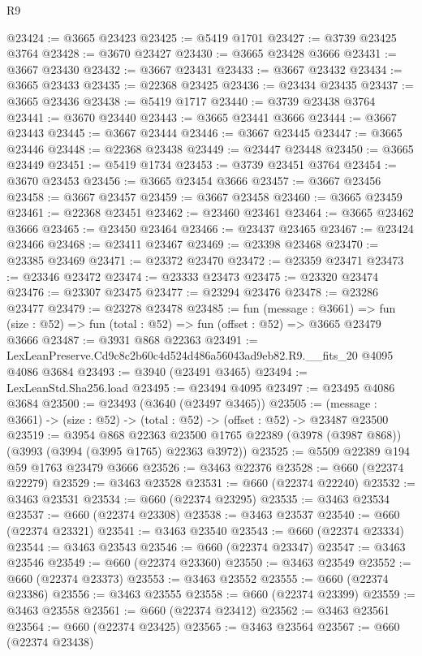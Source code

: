 \begin{lexlean}{R9}
\begin{coremodule}
@23424 := @3665 @23423
@23425 := @5419 @1701
@23427 := @3739 @23425 @3764
@23428 := @3670 @23427
@23430 := @3665 @23428 @3666
@23431 := @3667 @23430
@23432 := @3667 @23431
@23433 := @3667 @23432
@23434 := @3665 @23433
@23435 := @22368 @23425
@23436 := @23434 @23435
@23437 := @3665 @23436
@23438 := @5419 @1717
@23440 := @3739 @23438 @3764
@23441 := @3670 @23440
@23443 := @3665 @23441 @3666
@23444 := @3667 @23443
@23445 := @3667 @23444
@23446 := @3667 @23445
@23447 := @3665 @23446
@23448 := @22368 @23438
@23449 := @23447 @23448
@23450 := @3665 @23449
@23451 := @5419 @1734
@23453 := @3739 @23451 @3764
@23454 := @3670 @23453
@23456 := @3665 @23454 @3666
@23457 := @3667 @23456
@23458 := @3667 @23457
@23459 := @3667 @23458
@23460 := @3665 @23459
@23461 := @22368 @23451
@23462 := @23460 @23461
@23464 := @3665 @23462 @3666
@23465 := @23450 @23464
@23466 := @23437 @23465
@23467 := @23424 @23466
@23468 := @23411 @23467
@23469 := @23398 @23468
@23470 := @23385 @23469
@23471 := @23372 @23470
@23472 := @23359 @23471
@23473 := @23346 @23472
@23474 := @23333 @23473
@23475 := @23320 @23474
@23476 := @23307 @23475
@23477 := @23294 @23476
@23478 := @23286 @23477
@23479 := @23278 @23478
@23485 := fun (message : @3661) =>
  fun (size : @52) => fun (total : @52) => fun (offset : @52) => @3665 @23479 @3666
@23487 := @3931 @868 @22363
@23491 := LexLeanPreserve.Cd9c8c2b60c4d524d486a56043ad9eb82.R9.__fits_20 @4095 @4086 @3684
@23493 := @3940 (@23491 @3465)
@23494 := LexLeanStd.Sha256.load
@23495 := @23494 @4095
@23497 := @23495 @4086 @3684
@23500 := @23493 (@3640 (@23497 @3465))
@23505 := (message : @3661) -> (size : @52) -> (total : @52) -> (offset : @52) -> @23487 @23500
@23519 := @3954
    @868
    @22363
    @23500
    @1765
    @22389
    (@3978 (@3987 @868))
    (@3993 (@3994 (@3995 @1765) @22363 @3972))
@23525 := @5509 @22389 @194 @59 @1763 @23479 @3666
@23526 := @3463 @22376
@23528 := @660 (@22374 @22279)
@23529 := @3463 @23528
@23531 := @660 (@22374 @22240)
@23532 := @3463 @23531
@23534 := @660 (@22374 @23295)
@23535 := @3463 @23534
@23537 := @660 (@22374 @23308)
@23538 := @3463 @23537
@23540 := @660 (@22374 @23321)
@23541 := @3463 @23540
@23543 := @660 (@22374 @23334)
@23544 := @3463 @23543
@23546 := @660 (@22374 @23347)
@23547 := @3463 @23546
@23549 := @660 (@22374 @23360)
@23550 := @3463 @23549
@23552 := @660 (@22374 @23373)
@23553 := @3463 @23552
@23555 := @660 (@22374 @23386)
@23556 := @3463 @23555
@23558 := @660 (@22374 @23399)
@23559 := @3463 @23558
@23561 := @660 (@22374 @23412)
@23562 := @3463 @23561
@23564 := @660 (@22374 @23425)
@23565 := @3463 @23564
@23567 := @660 (@22374 @23438)

\end{coremodule}
\end{lexlean}
